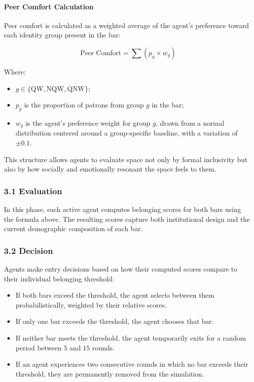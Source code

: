 \documentclass{article}
\begin{document}
\paragraph{Peer Comfort Calculation}

Peer comfort is calculated as a weighted average of the agent’s preference toward each identity group present in the bar:

\[
\text{Peer Comfort} = \sum (p_g \times w_g)
\]

Where:

\begin{itemize}
    \item $g \in \{\text{QW}, \text{NQW}, \text{QNW}\}$;
    \item $p_g$ is the proportion of patrons from group $g$ in the bar;
    \item $w_g$ is the agent’s preference weight for group $g$, drawn from a normal distribution centered around a group-specific baseline, with a variation of $\pm 0.1$.
\end{itemize}

This structure allows agents to evaluate space not only by formal inclusivity but also by how socially and emotionally resonant the space feels to them.

\subsubsection*{3.1 Evaluation}

In this phase, each active agent computes belonging scores for both bars using the formula above. The resulting scores capture both institutional design and the current demographic composition of each bar.

\subsubsection*{3.2 Decision}

Agents make entry decisions based on how their computed scores compare to their individual belonging threshold:

\begin{itemize}
    \item If both bars exceed the threshold, the agent selects between them probabilistically, weighted by their relative scores.
    \item If only one bar exceeds the threshold, the agent chooses that bar.
    \item If neither bar meets the threshold, the agent temporarily exits for a random period between $5$ and $15$ rounds.
    \item If an agent experiences two consecutive rounds in which no bar exceeds their threshold, they are permanently removed from the simulation.
\end{itemize}
\end{document}
